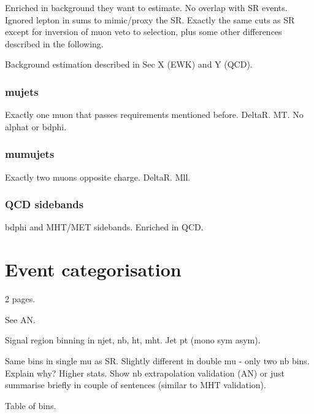 Enriched in background they want to estimate. No overlap with SR events. 
Ignored lepton in sums to mimic/proxy the SR. Exactly the same cuts as SR 
except for inversion of muon veto to selection, plus some other differences 
described in the following.

Background estimation described in Sec X (EWK) and Y (QCD).

\subsubsection{mujets}

Exactly one muon that passes requirements mentioned before. DeltaR. MT. No 
alphat or bdphi.

\subsubsection{mumujets}

Exactly two muons opposite charge. DeltaR. Mll.


\subsubsection{QCD sidebands} %

bdphi and MHT/MET sidebands. Enriched in QCD.

\section{Event categorisation}
2 pages.

See AN.

Signal region binning in njet, nb, ht, mht. 
Jet pt (mono sym asym).

Same bins in single mu as SR.
Slightly different in double mu - only two nb bins. Explain why? Higher stats. 
Show nb extrapolation validation (AN) or just summarise briefly in couple of 
sentences (similar to MHT validation).

Table of bins.


